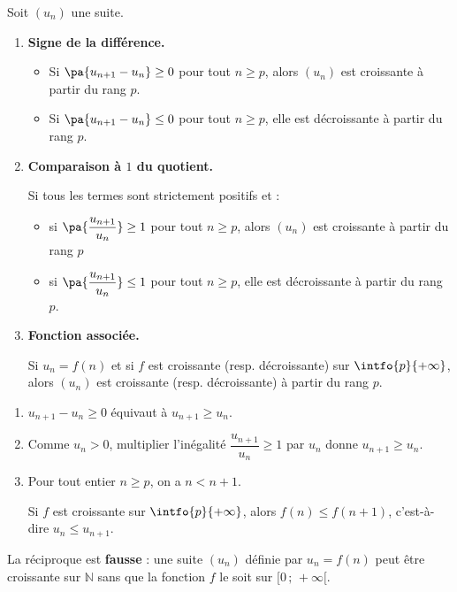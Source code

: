 \begin{propriete}
	Soit $(u_n)$ une suite.
	\begin{enumerate}
		\item \textbf{Signe de la différence.}
		      \begin{itemize}
			      \item Si $\pa{u_{n+1} - u_n} \geq 0$ pour tout $n \geq p$, alors $(u_n)$ est croissante à partir du rang $p$.
			      \item Si $\pa{u_{n+1} - u_n} \leq 0$ pour tout $n \geq p$, elle est décroissante à partir du rang $p$.
		      \end{itemize}
		\item \textbf{Comparaison à $1$ du quotient.}

		      Si tous les termes sont strictement positifs et :
		      \begin{itemize}
			      \item si $\pa{\dfrac{u_{n+1}}{u_n}} \geq 1$ pour tout $n \geq p$, alors $(u_n)$ est croissante à partir du rang $p$
			      \item si $\pa{\dfrac{u_{n+1}}{u_n}} \leq 1$ pour tout $n \geq p$, elle est décroissante à partir du rang $p$.
		      \end{itemize}
		\item \textbf{Fonction associée.}

		      Si $u_n = f(n)$ et si $f$ est croissante (resp. décroissante) sur $\intfo{p}{+\infty}$, alors $(u_n)$ est croissante (resp. décroissante) à partir du rang $p$.
	\end{enumerate}
\end{propriete}

\begin{demonstration}
	\nline
	\begin{enumerate}
		\item $u_{n+1} - u_n \geq 0$ équivaut à $u_{n+1} \geq u_n$.
		\item Comme $u_n > 0$, multiplier l'inégalité $\dfrac{u_{n+1}}{u_n} \geq 1$ par $u_n$ donne $u_{n+1} \geq u_n$.
		\item Pour tout entier $n \geq p$, on a $n < n + 1$.

		      Si $f$ est croissante sur $\intfo{p}{+\infty}$, alors $f(n) \leq f(n + 1)$, c'est-à-dire $u_n \leq u_{n+1}$.
	\end{enumerate}
\end{demonstration}

\begin{attention}
	La réciproque est \textbf{fausse} : une suite $(u_n)$ définie par $u_n = f(n)$ peut être croissante sur $\mathbb{N}$ sans que la fonction $f$ le soit sur $[0\,;\,+\infty[$.
\end{attention}


